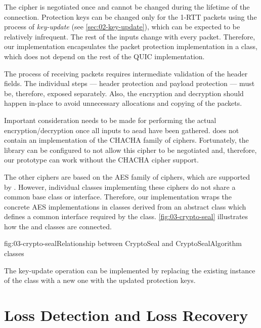 The cipher is negotiated once and cannot be changed during the lifetime of the connection.
Protection keys can be changed only for the 1-RTT packets using the process of
\textit{\gls{key-update}} (see \autoref{sec:02-key-update}), which can be expected to be relatively
infrequent. The rest of the inputs change with every packet. Therefore, our implementation
encapsulates the packet protection implementation in a  class, which does not
depend on the rest of the QUIC implementation.

The process of receiving packets requires intermediate validation of the header fields. The
individual steps --- header protection and payload protection --- must be, therefore, exposed
separately. Also, the encryption and decryption should happen in-place to avoid unnecessary
allocations and copying of the packets.

Important consideration needs to be made for performing the actual encryption/decryption once all
inputs to \gls{aead} have been gathered. \dotnet{} does not contain an implementation of the CHACHA
family of ciphers. Fortunately, the \libopenssl{} library can be configured to not allow this cipher
to be negotiated and, therefore, our prototype can work without the CHACHA cipher support.

The other ciphers are based on the AES family of ciphers, which are supported by \dotnet{}. However,
individual classes implementing these ciphers do not share a common base class or interface.
Therefore, our implementation wraps the concrete AES implementations in classes derived from an
abstract  class which defines a common interface required by
the \CryptoSeal{} class. \autoref{fig:03-crypto-seal} illustrates how the \CryptoSeal{} and
 classes are connected.

\begin{myFigure}{fig:03-crypto-seal}{Relationship between CryptoSeal and CryptoSealAlgorithm
classes}

  \resizebox{\linewidth}{!}{}

\end{myFigure}

The \gls{key-update} operation can be implemented by replacing the existing instance of the
\CryptoSeal{} class with a new one with the updated protection keys.

\section{Loss Detection and Loss Recovery}

